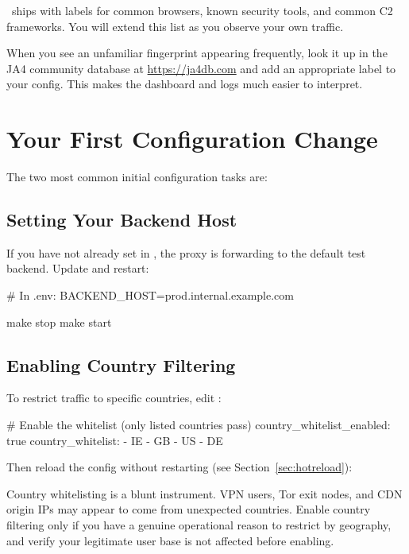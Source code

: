 \ja\ ships with labels for common browsers, known security tools, and common C2
frameworks. You will extend this list as you observe your own traffic.

When you see an unfamiliar fingerprint appearing frequently, look it up in the JA4
community database at \url{https://ja4db.com} and add an appropriate label to your
config. This makes the dashboard and logs much easier to interpret.

\section{Your First Configuration Change}

The two most common initial configuration tasks are:

\subsection{Setting Your Backend Host}

If you have not already set  in , the proxy is
forwarding to the default test backend. Update  and restart:

\begin{bashcode}
# In .env:
BACKEND_HOST=prod.internal.example.com

make stop
make start
\end{bashcode}

\subsection{Enabling Country Filtering}

To restrict traffic to specific countries, edit :

\begin{yamlcode}
# Enable the whitelist (only listed countries pass)
country_whitelist_enabled: true
country_whitelist:
  - IE
  - GB
  - US
  - DE
\end{yamlcode}

Then reload the config without restarting (see Section~\ref{sec:hotreload}):


\begin{warningbox}
Country whitelisting is a blunt instrument. VPN users, Tor exit nodes, and CDN
origin IPs may appear to come from unexpected countries. Enable country filtering
only if you have a genuine operational reason to restrict by geography, and verify
your legitimate user base is not affected before enabling.
\end{warningbox}
